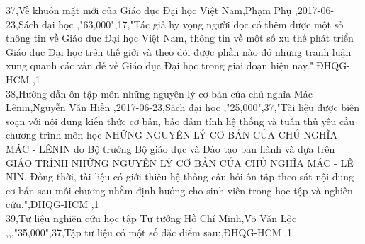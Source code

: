 \documentclass[a4paper]{article}
\begin{document}
37,Về khuôn mặt mới của Giáo dục Đại học Việt Nam,Phạm Phụ ,2017-06-23,Sách đại học ,"63,000",17,"Tác giả hy vọng người đọc có thêm được một số thông tin về Giáo dục Đại học Việt Nam, thông tin về một số xu thế phát triển Giáo dục Đại học trên thế giới và theo dõi được phần nào đó những tranh luận xung quanh các vấn đề về Giáo dục Đại học trong giai đoạn hiện nay.",ĐHQG-HCM ,1\\
38,Hướng dẫn ôn tập môn những nguyên lý cơ bản của chủ nghĩa Mác - Lênin,Nguyễn Văn Hiền ,2017-06-23,Sách đại học ,"25,000",37,"Tài liệu được biên soạn với nội dung kiến thức cơ bản, bảo đảm tính hệ thống và tuân thủ yêu cầu chương trình môn học NHỮNG NGUYÊN LÝ CƠ BẢN CỦA CHỦ NGHĨA MÁC - LÊNIN do Bộ trưởng Bộ giáo dục và Đào tạo ban hành và dựa trên GIÁO TRÌNH NHỮNG NGUYÊN LÝ CƠ BẢN CỦA CHỦ NGHĨA MÁC - LÊ NIN. Đồng thời, tài liệu có giới thiệu hệ thống câu hỏi ôn tập theo sát nội dung cơ bản sau mỗi chương nhằm định hướng cho sinh viên trong học tập và nghiên cứu.",ĐHQG-HCM ,1\\
39,Tư liệu nghiên cứu học tập Tư tưởng Hồ Chí Minh,Võ Văn Lộc ,,,"35,000",37,Tập tư liệu có một số đặc điểm sau:,ĐHQG-HCM ,1\\
\end{document}

